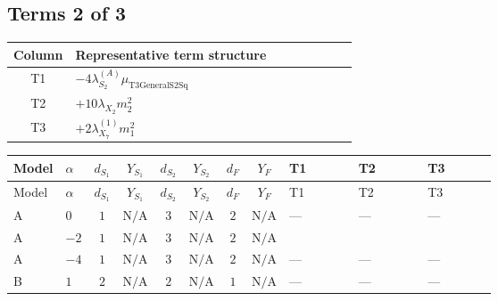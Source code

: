 \documentclass[8pt]{article}
\begin{document}
\begin{landscape}
\subsection*{Terms 2 of 3}
\begin{center}
\begin{tabular}{@{}c >{\raggedright\arraybackslash}p{0.82\linewidth}@{}}
\toprule
Column & Representative term structure \\
\midrule
T1 & \(\displaystyle -4 {\lambda_{S_2}^{(A)}} {\mu_{\mathrm{T3GeneralS2Sq}}}\) \\
\midrule
T2 & \(\displaystyle +10 {\lambda_{X_{2}}} {m_2^2}\) \\
\midrule
T3 & \(\displaystyle +2 {\lambda_{X_{7}}^{(1)}} {m_1^2}\) \\
\midrule
\bottomrule
\end{tabular}
\end{center}
\smallskip
\tiny
\begin{longtable}{@{}llcccccc >{\raggedright\arraybackslash}p{0.21\linewidth} >{\raggedright\arraybackslash}p{0.21\linewidth} >{\raggedright\arraybackslash}p{0.21\linewidth}@{}}
\toprule
Model & $\alpha$ & $d_{S_1}$ & $Y_{S_1}$ & $d_{S_2}$ & $Y_{S_2}$ & $d_F$ & $Y_F$ & T1 & T2 & T3 \\
\midrule
\endfirsthead
\toprule
Model & $\alpha$ & $d_{S_1}$ & $Y_{S_1}$ & $d_{S_2}$ & $Y_{S_2}$ & $d_F$ & $Y_F$ & T1 & T2 & T3 \\
\midrule
\endhead
A & $0$ & $1$ & $\text{N/A}$ & $3$ & $\text{N/A}$ & $2$ & $\text{N/A}$ & --- & --- & --- \\
\midrule
A & $-2$ & $1$ & $\text{N/A}$ & $3$ & $\text{N/A}$ & $2$ & $\text{N/A}$ & \scriptsize\adjustbox{max width=\linewidth}{$\begin{gathered} -4 {\lambda_{S_2}^{(A)}} {\mu_{\mathrm{T3GeneralS2Sq}}}\end{gathered}$} & \scriptsize\adjustbox{max width=\linewidth}{$\begin{gathered} +10 {\lambda_{X_{2}}} {m_2^2}\end{gathered}$} & \scriptsize\adjustbox{max width=\linewidth}{$\begin{gathered} +2 {\lambda_{X_{7}}^{(1)}} {m_1^2}\end{gathered}$} \\
\midrule
A & $-4$ & $1$ & $\text{N/A}$ & $3$ & $\text{N/A}$ & $2$ & $\text{N/A}$ & --- & --- & --- \\
\midrule
B & $1$ & $2$ & $\text{N/A}$ & $2$ & $\text{N/A}$ & $1$ & $\text{N/A}$ & --- & --- & --- \\

\end{longtable}
\end{landscape}
\end{document}
